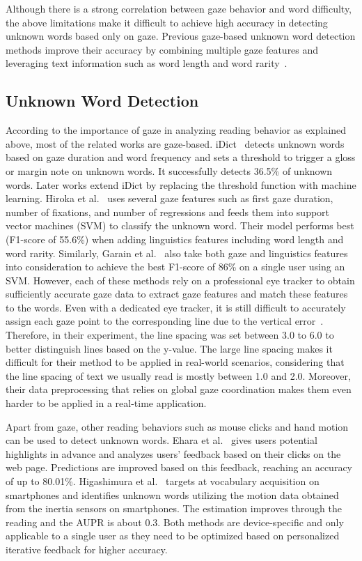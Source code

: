 Although there is a strong correlation between gaze behavior and word difficulty, the above limitations make it difficult to achieve high accuracy in detecting unknown words based only on gaze.
Previous gaze-based unknown word detection methods improve their accuracy by combining multiple gaze features and leveraging text information such as word length and word rarity~\cite{unknown-word_hiraoka_2016, gaze-text_garain_2017}. 

\subsection{Unknown Word Detection}

According to the importance of gaze in analyzing reading behavior as explained above, most of the related works are gaze-based. iDict~\cite{idict2006hyrskykari} detects unknown words based on gaze duration and word frequency and sets a threshold to trigger a gloss or margin note on unknown words. It successfully detects 36.5\% of unknown words. Later works extend iDict by replacing the threshold function with machine learning. Hiroka et al.~\cite{unknown-word_hiraoka_2016} uses several gaze features such as first gaze duration, number of fixations, and number of regressions and feeds them into support vector machines (SVM) to classify the unknown word. Their model performs best (F1-score of 55.6\%) when adding linguistics features including word length and word rarity. Similarly, Garain et al.~\cite{gaze-text_garain_2017} also take both gaze and linguistics features into consideration to achieve the best F1-score of 86\% on a single user using an SVM. However, each of these methods rely on a professional eye tracker to obtain sufficiently accurate gaze data to extract  gaze features and match these features to the words. Even with a dedicated eye tracker, it is still difficult to accurately assign each gaze point to the corresponding line due to the vertical error~\cite{yamaya2015dynamic, Sanches2016Vertical}. Therefore, in their experiment, the line spacing was set between 3.0 to 6.0 to better distinguish lines based on the y-value. The large line spacing makes it difficult for their method to be applied in real-world scenarios, considering that the line spacing of text we usually read is mostly between 1.0 and 2.0. Moreover, their data preprocessing that relies on global gaze coordination makes them even harder to be applied in a real-time application.

Apart from gaze, other reading behaviors such as mouse clicks and hand motion can be used to detect unknown words. Ehara et al.~\cite{web_ehara_2010} gives users potential highlights in advance and analyzes users' feedback based on their clicks on the web page. Predictions are improved based on this feedback, reaching an accuracy of up to 80.01\%. Higashimura et al.~\cite{imu_higa_2022} targets at vocabulary acquisition on smartphones and identifies unknown words utilizing the motion data obtained from the inertia sensors on smartphones. The estimation improves through the reading and the AUPR is about 0.3. Both methods are device-specific and only applicable to a single user as they need to be optimized based on personalized iterative feedback for higher accuracy.

